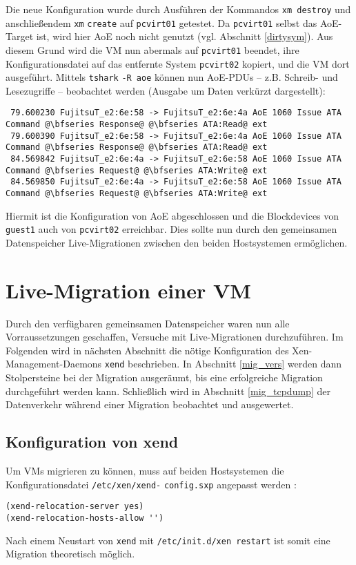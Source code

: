 Die neue Konfiguration wurde durch Ausführen der Kommandos \verb#xm destroy# und anschließendem \verb#xm# \verb#create# auf \verb#pcvirt01# getestet. Da \verb#pcvirt01# selbst das AoE-Target ist, wird hier AoE noch nicht genutzt (vgl. Abschnitt \ref{dirtysym}).
Aus diesem Grund wird die VM nun abermals auf \verb#pcvirt01# beendet, ihre Konfigurationsdatei auf das entfernte System \verb#pcvirt02# kopiert, und die VM dort ausgeführt. Mittels \verb#tshark# \verb#-R aoe# können nun AoE-PDUs -- z.B. Schreib- und Lesezugriffe -- beobachtet werden (Ausgabe um Daten verkürzt dargestellt):
\setupVerbatimOut
\begin{verbatim}
 79.600230 FujitsuT_e2:6e:58 -> FujitsuT_e2:6e:4a AoE 1060 Issue ATA Command @\bfseries Response@ @\bfseries ATA:Read@ ext
 79.600390 FujitsuT_e2:6e:58 -> FujitsuT_e2:6e:4a AoE 1060 Issue ATA Command @\bfseries Response@ @\bfseries ATA:Read@ ext
 84.569842 FujitsuT_e2:6e:4a -> FujitsuT_e2:6e:58 AoE 1060 Issue ATA Command @\bfseries Request@ @\bfseries ATA:Write@ ext
 84.569850 FujitsuT_e2:6e:4a -> FujitsuT_e2:6e:58 AoE 1060 Issue ATA Command @\bfseries Request@ @\bfseries ATA:Write@ ext
\end{verbatim}

Hiermit ist die Konfiguration von AoE abgeschlossen und die Blockdevices von \verb#guest1# auch von \verb#pcvirt02# erreichbar. Dies sollte nun durch den gemeinsamen Datenspeicher Live-Migrationen zwischen den beiden Hostsystemen ermöglichen.

\chapter{Live-Migration einer VM}
Durch den verfügbaren gemeinsamen Datenspeicher waren nun alle Vorraussetzungen geschaffen, Versuche mit Live-Migrationen durchzuführen. Im Folgenden wird in nächsten Abschnitt die nötige Konfiguration des Xen-Management-Daemons \verb#xend# beschrieben. In Abschnitt \ref{mig_vers} werden dann Stolpersteine bei der Migration ausgeräumt, bis eine erfolgreiche Migration durchgeführt werden kann. Schließlich wird in Abschnitt \ref{mig_tcpdump} der Datenverkehr während einer Migration beobachtet und ausgewertet.
\section{Konfiguration von xend}\label{xend_konfig}
Um VMs migrieren zu können, muss auf beiden Hostsystemen die Konfigurationsdatei \verb#/etc/xen/xend-# \verb#config.sxp# angepasst werden \cite{man_xendconfig}:
\setupVerbatimOut
\begin{verbatim}
(xend-relocation-server yes)
(xend-relocation-hosts-allow '')
\end{verbatim} 
Nach einem Neustart von \verb#xend# mit \verb#/etc/init.d/xen restart# ist somit eine Migration theoretisch möglich. 

